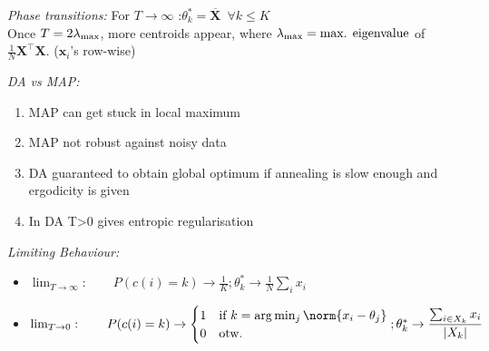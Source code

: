 \emph{Phase transitions:}\enspace
For $T {\to} \infty$ :\enspace $\theta_k^\ast = \overline{\bm X} \enspace \forall k\leq K$\\
Once $T=2\lambda_\mathrm{max}$, more centroids appear, where $\lambda_\mathrm{max} = \textrm{max. eigenvalue}$ of $\frac1N \bm X^\top \bm X$.
\enspace($\bm x_i$'s row-wise)

\emph{DA vs MAP:}\enspace
\begin{enumerate}
    \item MAP can get stuck in local maximum
    \item MAP not robust against noisy data
    \item DA guaranteed to obtain global optimum if annealing is slow enough and ergodicity is given
    \item In DA T>0 gives entropic regularisation
\end{enumerate}

\emph{Limiting Behaviour:}\enspace
\begin{itemize}
    \item $\lim_{T\to \infty}:\qquad P(c(i)=k) \rightarrow \frac{1}{K}; \theta_k^\ast \rightarrow \frac1N \sum_i x_i$
    \item $\lim_{T\to 0}:\qquad P(c(i)=k) \rightarrow \begin{cases} 1 & \text{if } k = \arg\min_j \norm{x_i - \theta_j} \\ 0 & \text{otw.} \end{cases}; \theta_k^\ast \rightarrow \dfrac{\sum_{i\in X_k} x_i}{|X_k|}$
\end{itemize}

